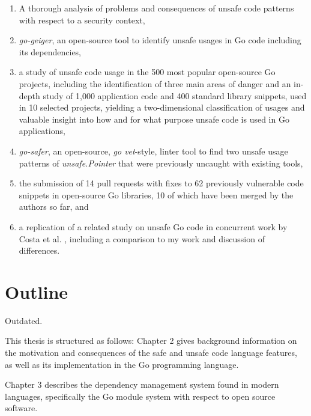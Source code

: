 \begin{enumerate}
    \item A thorough analysis of problems and consequences of unsafe code patterns with respect to a security context,

    \item \textit{go-geiger}, an open-source tool to identify unsafe usages in Go code including its dependencies,

    \item a study of unsafe code usage in the 500 most popular open-source Go projects, including the identification
    of three main areas of danger and an in-depth study of 1,000 application code and 400 standard library snippets,
    used in 10 selected projects, yielding a two-dimensional classification of usages and valuable insight into how and
    for what purpose unsafe code is used in Go applications,

    \item \textit{go-safer}, an open-source, \textit{go vet}-style, linter tool to find two unsafe usage patterns of
    \textit{unsafe.Pointer} that were previously uncaught with existing tools,

    \item the submission of 14 pull requests with fixes to 62 previously vulnerable code snippets in open-source Go
    libraries, 10 of which have been merged by the authors so far, and

    \item a replication of a related study on unsafe Go code in concurrent work by Costa et al. \cite{costa2020},
    including a comparison to my work and discussion of differences.
\end{enumerate}



\section{Outline}\label{sec:outline}

Outdated.

This thesis is structured as follows: Chapter 2 gives background information on the motivation
and consequences of the safe and unsafe code language features, as well as its implementation
in the Go programming language.

Chapter 3 describes the dependency management system found in modern languages, specifically
the Go module system with respect to open source software.

